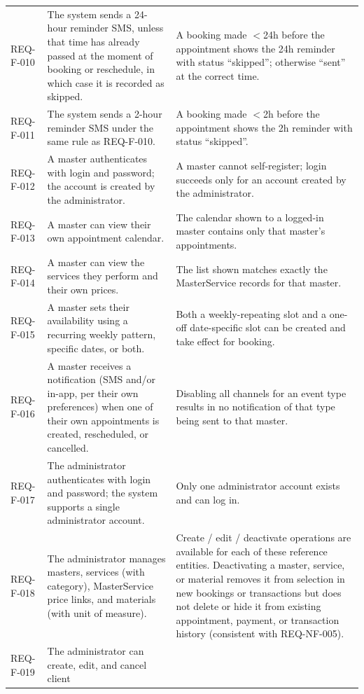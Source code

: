 \documentclass[11pt,a4paper]{article}
\begin{document}
\begin{longtable}{L{1.9cm}L{6.4cm}L{6.2cm}}
REQ-F-010 & The system sends a 24-hour reminder SMS, unless that time has
  already passed at the moment of booking or reschedule, in which case it
  is recorded as skipped. & A booking made $<$24h before the appointment
  shows the 24h reminder with status ``skipped''; otherwise ``sent'' at the
  correct time. \\
REQ-F-011 & The system sends a 2-hour reminder SMS under the same rule as
  REQ-F-010. & A booking made $<$2h before the appointment shows the 2h
  reminder with status ``skipped''. \\
REQ-F-012 & A master authenticates with login and password; the account is
  created by the administrator. & A master cannot self-register; login
  succeeds only for an account created by the administrator. \\
REQ-F-013 & A master can view their own appointment calendar. & The
  calendar shown to a logged-in master contains only that master's
  appointments. \\
REQ-F-014 & A master can view the services they perform and their own
  prices. & The list shown matches exactly the MasterService records for
  that master. \\
REQ-F-015 & A master sets their availability using a recurring weekly
  pattern, specific dates, or both. & Both a weekly-repeating slot and a
  one-off date-specific slot can be created and take effect for booking. \\
REQ-F-016 & A master receives a notification (SMS and/or in-app, per their
  own preferences) when one of their own appointments is created,
  rescheduled, or cancelled. & Disabling all channels for an event type
  results in no notification of that type being sent to that master. \\
REQ-F-017 & The administrator authenticates with login and password; the
  system supports a single administrator account. & Only one administrator
  account exists and can log in. \\
REQ-F-018 & The administrator manages masters, services (with category),
  MasterService price links, and materials (with unit of measure). & Create
  / edit / deactivate operations are available for each of these reference
  entities. Deactivating a master, service, or material removes it from
  selection in new bookings or transactions but does not delete or hide it
  from existing appointment, payment, or transaction history (consistent
  with REQ-NF-005). \\
REQ-F-019 & The administrator can create, edit, and cancel client

\end{longtable}
\end{document}

